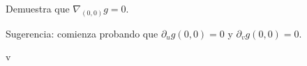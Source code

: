 \documentclass{article}
\theoremstyle{definition}
\begin{document}
\begin{enumerate}
\begin{enumerate}
             Demuestra que $\nabla_{(0,0)}g=0$.
             
             Sugerencia: comienza probando que   $\partial_ug(0,0)=0$ y $\partial_{v}g(0,0)=0$. 

           \end{enumerate}

  
  \end{enumerate}


v  
       
\end{document}
